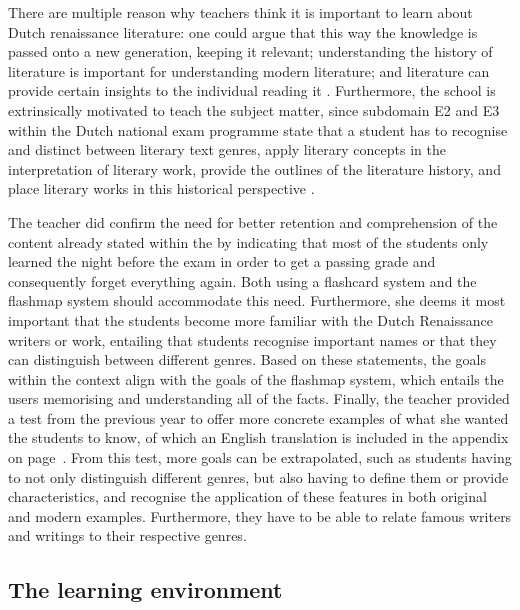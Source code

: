 There are multiple reason why teachers think it is important to learn about Dutch renaissance literature: one could argue that this way the knowledge is passed onto a new generation, keeping it relevant; understanding the history of literature is important for understanding modern literature; and literature can provide certain insights to the individual reading it \cite{opinion1, opinion2}. Furthermore, the school is extrinsically motivated to teach the subject matter, since subdomain E2 and E3 within the Dutch national exam programme state that a student has to recognise and distinct between literary text genres, apply literary concepts in the interpretation of literary work, provide the outlines of the literature history, and place literary works in this historical perspective \cite{eindexamen}.

The teacher did confirm the need for better retention and comprehension of the content already stated within the  by indicating that most of the students only learned the night before the exam in order to get a passing grade and consequently forget everything again. Both using a flashcard system and the flashmap system should accommodate this need. Furthermore, she deems it most important that the students become more familiar with the Dutch Renaissance writers or work, entailing that students recognise important names or that they can distinguish between different genres. Based on these statements, the goals within the context align with the goals of the flashmap system, which entails the users memorising and understanding all of the facts. Finally, the teacher provided a test from the previous year to offer more concrete examples of what she wanted the students to know, of which an English translation is included in the  appendix on page~\pageref{app:exampletest}. From this test, more goals can be extrapolated, such as students having to not only distinguish different genres, but also having to define them or provide characteristics, and recognise the application of these features in both original and modern examples. Furthermore, they have to be able to relate famous writers and writings to their respective genres.

\subsection{The learning environment}
\label{subsec:learningenvironment}

